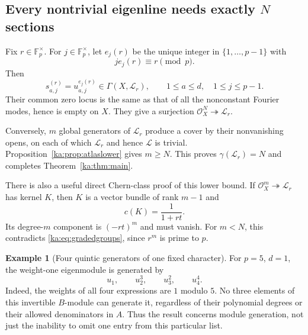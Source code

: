 \documentclass[11pt,a4paper]{article}
\theoremstyle{definition}
\newtheorem{example}[theorem]{Example}
\theoremstyle{remark}
\newcommand{\F}{\mathbb F}
\newcommand{\OO}{\mathcal O}
\newcommand{\LL}{\mathcal L}
\newcommand{\gen}{\gamma}
\begin{document}
\subsection{Every nontrivial eigenline needs exactly \texorpdfstring{$N$}{N} sections}
Fix $r\in\F_p^\times$. For $j\in\F_p^\times$, let $e_j(r)$ be the
unique integer in $\{1,\ldots,p-1\}$ with
\begin{equation}
 j e_j(r)\equiv r\pmod p.
 \label{ka:eq:exponents}
\end{equation}
Then
\begin{equation}
 s_{a,j}^{(r)}=u_{a,j}^{e_j(r)}\in\Gamma(X,\LL_r),
 \qquad 1\leq a\leq d,\quad1\leq j\leq p-1.
 \label{ka:eq:fixedweightsections}
\end{equation}
Their common zero locus is the same as that of all the nonconstant
Fourier modes, hence is empty on $X$. They give a surjection
$\OO_X^N\twoheadrightarrow\LL_r$.

Conversely, $m$ global generators of $\LL_r$ produce a cover by their
nonvanishing opens, on each of which $\LL_r$ and hence $\LL$ is trivial.
Proposition~\ref{ka:prop:atlaslower} gives $m\geq N$. This proves
$\gen(\LL_r)=N$ and completes Theorem~\ref{ka:thm:main}.

There is also a useful direct Chern-class proof of this lower bound.
If $\OO_X^m\twoheadrightarrow\LL_r$ has kernel $K$, then $K$ is a
vector bundle of rank $m-1$ and
\[
 c(K)=\frac{1}{1+r t}.
\]
Its degree-$m$ component is $(-r t)^m$ and must vanish. For $m<N$,
this contradicts \eqref{ka:eq:gradedgroups}, since $r^m$ is prime to $p$.

\begin{example}[Four quintic generators of one fixed character]
For $p=5$, $d=1$, the weight-one eigenmodule is generated by
\[
 u_1,\qquad u_2^3,\qquad u_3^2,\qquad u_4^4.
\]
Indeed, the weights of all four expressions are $1$ modulo $5$.
No three elements of this invertible $B$-module can generate it,
regardless of their polynomial degrees or their allowed denominators in
$A$. Thus the result concerns module generation, not just the inability
to omit one entry from this particular list.
\end{example}
\end{document}
